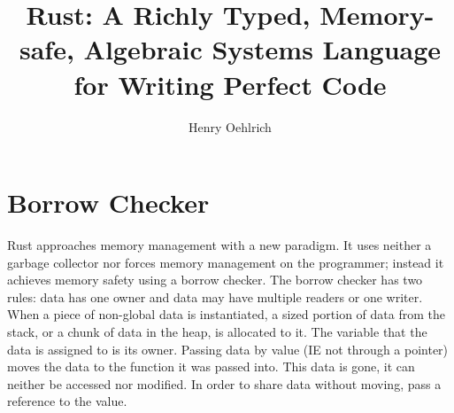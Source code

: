 \documentclass{article}
\title{Rust: A Richly Typed, Memory-safe, Algebraic Systems Language for Writing Perfect Code}
\author{Henry Oehlrich}
\begin{document}
\maketitle{}

\section{Borrow Checker}

Rust approaches memory management with a new paradigm. It uses neither a
garbage collector nor forces memory management on the programmer; instead it
achieves memory safety using a borrow checker. The borrow checker has two
rules: data has one owner and data may have multiple readers or one writer.
When a piece of non-global data is instantiated, a sized portion of data from
the stack, or a chunk of data in the heap, is allocated to it. The variable
that the data is assigned to is its owner. Passing data by value (IE not
through a pointer) moves the data to the function it was passed into. This data
is gone, it can neither be accessed nor modified. In order to share data
without moving, pass a reference to the value.

\cite{rustforrustaceans} \\
\cite{rust-lang.org} \\
\cite{rust-by-example} \\
\cite{the-c-programming-language} \\
\cite{noboilerplate}


 
\end{document}
